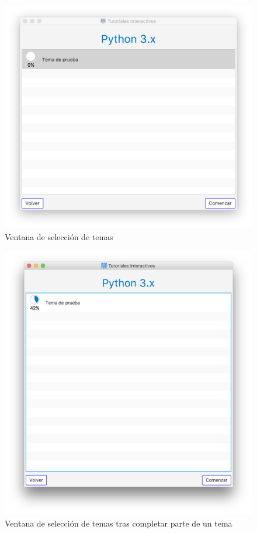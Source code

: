 \documentclass[]{article}
\begin{document}
%
\begin{figure}[tbp]
\begin{center}
\includegraphics[scale=0.35,trim={40px 40px 40px 30px},clip]{ng_2.png}
\end{center}
\caption{Ventana de selección de temas\label{fig:ng_2}}
\end{figure}
%

%
\begin{figure}[tbp]
\begin{center}
\includegraphics[scale=0.35,trim={50px 50px 50px 30px},clip]{ng_3.png}
\end{center}
\caption{Ventana de selección de temas tras completar parte de un tema\label{fig:ng_3}}
\end{figure}
%
\end{document}
